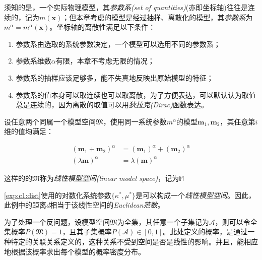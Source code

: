 \begin{character}[离散性] \label{cha:c1:modeldiscre}

须知的是，一个实际物理模型，其\emph{参数系(set of quantities)}(亦即坐标轴)往往是连续的，记为$m(\mathbf{x})$；但本章考虑的模型是经过抽样、离散化的模型，其\emph{参数系}为$m^{\alpha}=m^{\alpha}(\mathbf{x})$。坐标轴的离散性满足以下条件：

\begin{enumerate}
  \item 参数系由选取的系统参数决定，一个模型可以选用不同的参数系；
  \item 参数系维数$\alpha$有限，本章不考虑无限的情况；
  \item 参数系的抽样应该足够多，能不失真地反映出原始模型的特征；
  \item 参数系的值本身可以取连续也可以取离散，为了方便表达，可以默认认为取值总是连续的，因为离散的取值可以用\emph{狄拉克(Dirac)}函数表达。
\end{enumerate}

\end{character}

\begin{character}[线性] \label{cha:c1:modellin}
  
  设任意两个同属一个模型空间$\mathfrak{M}$，使用同一系统参数$m^{\alpha}$的模型$\mathbf{m}_1,\mathbf{m}_2$，其任意第$i$维的值均满足：
  
  \begin{align} 
    (\mathbf{m}_1+\mathbf{m}_2)^{\alpha} &= (\mathbf{m}_1)^{\alpha} + (\mathbf{m}_2)^{\alpha} \label{fml:c1:modellinearity1} \\
    (\lambda \mathbf{m})^{\alpha} &= \lambda(\mathbf{m})^{\alpha}\label{fml:c1:modellinearity2}
  \end{align}
  
  这样的的$\mathfrak{M}$称为\emph{线性模型空间(linear model space)}，记为$\mathbb{M}$
  
\end{character}

\autoref{exp:c1:dist}使用的对数化系统参数$\{\kappa^{\ast}, \mu^{\ast}\}$是可以构成一个\emph{线性模型空间}。因此，此例中的距离$d$相当于该线性空间的\emph{\textit{Euclidean}范数}。

为了处理一个反问题，设模型空间$\mathfrak{M}$为全集，其任意一个子集记为$\mathcal{A}$，则可以令全集概率$P(\mathfrak{M})=1$，且其子集概率$P(\mathcal{A})\in [0,1]$。此处定义的概率，是通过一种特定的关联关系定义的，这种关系不受到空间是否是线性的影响。并且，能相应地根据该概率求出每个模型的概率密度分布。

